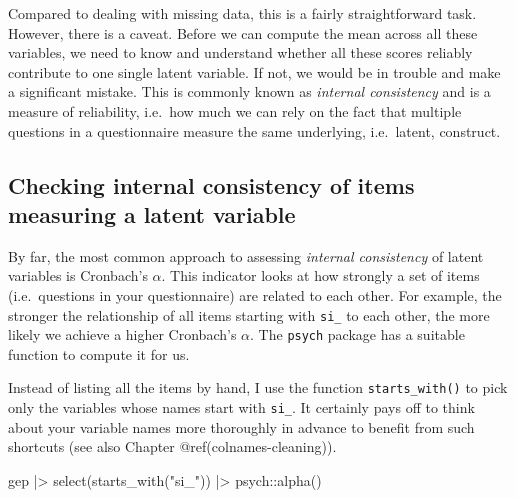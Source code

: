 \documentclass[
  letterpaper,
]{krantz}
\makeatletter
\newenvironment{Shaded}{\begin{snugshade}}{\end{snugshade}}
\newcommand{\FunctionTok}[1]{\textcolor[rgb]{0.28,0.35,0.67}{#1}}
\newcommand{\NormalTok}[1]{\textcolor[rgb]{0.00,0.23,0.31}{#1}}
\newcommand{\SpecialCharTok}[1]{\textcolor[rgb]{0.37,0.37,0.37}{#1}}
\newcommand{\StringTok}[1]{\textcolor[rgb]{0.13,0.47,0.30}{#1}}
\newenvironment{kframe}{%
\medskip{}
\setlength{\fboxsep}{.8em}
 \def\at@end@of@kframe{}%
 \ifinner\ifhmode%
  \def\at@end@of@kframe{\end{minipage}}%
  \begin{minipage}{\columnwidth}%
 \fi\fi%
 \def\FrameCommand##1{\hskip\@totalleftmargin \hskip-\fboxsep
 \colorbox{shadecolor}{##1}\hskip-\fboxsep
     \hskip-\linewidth \hskip-\@totalleftmargin \hskip\columnwidth}%
 \MakeFramed {\advance\hsize-\width
   \@totalleftmargin\z@ \linewidth\hsize
   \@setminipage}}%
 {\par\unskip\endMakeFramed%
 \at@end@of@kframe}
\renewenvironment{Shaded}{\begin{kframe}}{\end{kframe}}
\makeatother
\begin{document}
Compared to dealing with missing data, this is a fairly straightforward
task. However, there is a caveat. Before we can compute the mean across
all these variables, we need to know and understand whether all these
scores reliably contribute to one single latent variable. If not, we
would be in trouble and make a significant mistake. This is commonly
known as \emph{internal consistency} and is a measure of reliability,
i.e.~how much we can rely on the fact that multiple questions in a
questionnaire measure the same underlying, i.e.~latent, construct.

\subsection{Checking internal consistency of items measuring a latent
variable}\label{sec-internal-consistency}

By far, the most common approach to assessing \emph{internal
consistency} of latent variables is Cronbach's \(\alpha\). This
indicator looks at how strongly a set of items (i.e.~questions in your
questionnaire) are related to each other. For example, the stronger the
relationship of all items starting with \texttt{si\_} to each other, the
more likely we achieve a higher Cronbach's \(\alpha\). The
\texttt{psych} package has a suitable function to compute it for us.

Instead of listing all the items by hand, I use the function
\texttt{starts\_with()} to pick only the variables whose names start
with \texttt{si\_}. It certainly pays off to think about your variable
names more thoroughly in advance to benefit from such shortcuts (see
also Chapter @ref(colnames-cleaning)).

\begin{Shaded}
\begin{Highlighting}[]
\NormalTok{gep }\SpecialCharTok{|\textgreater{}}
  \FunctionTok{select}\NormalTok{(}\FunctionTok{starts\_with}\NormalTok{(}\StringTok{"si\_"}\NormalTok{)) }\SpecialCharTok{|\textgreater{}}
\NormalTok{  psych}\SpecialCharTok{::}\FunctionTok{alpha}\NormalTok{()}
\end{Highlighting}
\end{Shaded}
\end{document}
